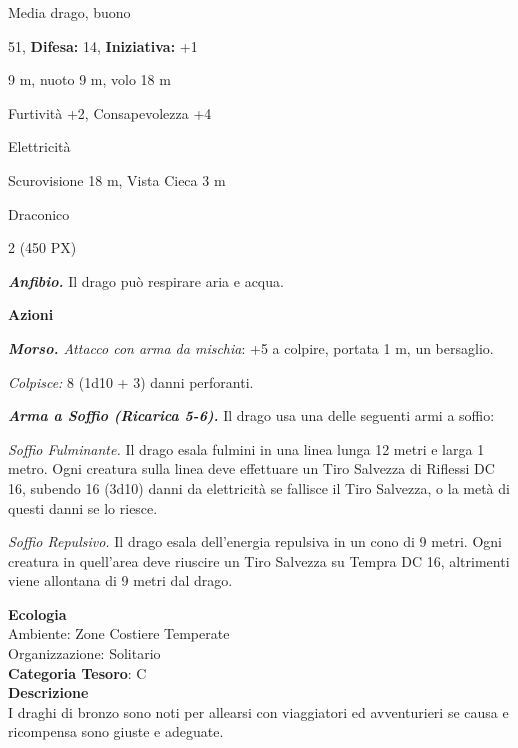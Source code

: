 \begin{multicols}{2}
{
\noindent
\begin{description}[noitemsep, topsep=0pt, parsep=0pt, partopsep=0pt, leftmargin=0cm, labelwidth=2.2cm]
	\item[\textbf{Taglia/Tipo:}] Media drago, buono
	\item[\textbf{Caratt.:}] 
	\item[\textbf{Punti Ferita:}] 51,  \textbf{Difesa:} 14,  \textbf{Iniziativa:} +1
	\item[\textbf{Movimento:}] 9 m, nuoto 9 m, volo 18 m
	\item[\textbf{Tiri Salvez.:}] 
	\item[\textbf{Comp.:}] Furtività +2, Consapevolezza +4
	\item[\textbf{Imm. Danni:}] Elettricità
	\item[\textbf{Sensi:}] Scurovisione 18 m, Vista Cieca 3 m
	\item[\textbf{Linguaggi:}] Draconico
	\item[\textbf{Sfida:}] 2 (450 PX)\smallskip
\end{description}

\emph{\textbf{Anfibio.}} Il drago può respirare aria e acqua.

\textbf{Azioni}

\emph{\textbf{Morso.} Attacco con arma da mischia}: +5 a colpire,
portata 1 m, un bersaglio.

\emph{Colpisce:} 8 (1d10 + 3) danni perforanti.

\emph{\textbf{Arma a Soffio (Ricarica 5-6).}} Il drago usa una delle seguenti armi a soffio:

\emph{Soffio Fulminante.} Il drago esala fulmini in una linea lunga 12 metri e larga 1 metro. Ogni creatura sulla linea deve effettuare un Tiro Salvezza di Riflessi DC 16, subendo 16 (3d10) danni da elettricità se fallisce il Tiro Salvezza, o la metà di questi danni se lo riesce.

\emph{Soffio Repulsivo.} Il drago esala dell'energia repulsiva in un cono di 9 metri. Ogni creatura in quell'area deve riuscire un Tiro Salvezza su Tempra DC 16, altrimenti viene allontana di 9 metri dal drago.

\textbf{Ecologia}\\
Ambiente: Zone Costiere Temperate\\
Organizzazione: Solitario\\
\textbf{Categoria Tesoro}: C\\
\textbf{Descrizione}\\
I draghi di bronzo sono noti per allearsi con viaggiatori ed avventurieri se causa e ricompensa sono giuste e adeguate.

}
\end{multicols}
